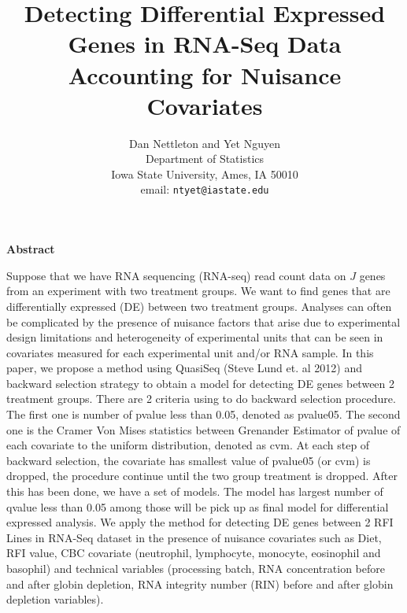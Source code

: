\documentclass[12pt, letter]{article}\usepackage[]{graphicx}\usepackage[]{color}
\begin{document}
\title{\bf Detecting Differential Expressed Genes in RNA-Seq Data
Accounting for Nuisance Covariates}
\author{Dan Nettleton  and Yet Nguyen\\
Department of Statistics \\ 
Iowa State University, Ames, IA 50010\\ 
email: \texttt{ntyet@iastate.edu} }

\maketitle



\begin{center}
\textbf{Abstract}
\end{center}

Suppose that we have RNA sequencing (RNA-seq) read count data
on $J$ genes from an experiment with two treatment groups.
We want to find genes that are differentially expressed (DE) between
two treatment groups.
Analyses can often be complicated by the presence of nuisance factors
that arise due to experimental design limitations and heterogeneity of
experimental units that can be seen in  covariates
measured for each experimental unit and/or RNA sample. In this paper, we propose a method using QuasiSeq (Steve Lund et. al 2012) and backward selection strategy to obtain a  model for detecting DE genes between 2 treatment groups. 
There are 2 criteria using to do backward selection procedure. The first one is number of pvalue less than 0.05, denoted as pvalue05. The second one is the Cramer Von Mises statistics between Grenander Estimator of pvalue of each covariate to the uniform distribution, denoted as cvm. At each step of backward selection, the covariate has smallest value of pvalue05 (or cvm) is dropped, the procedure continue until the two group treatment is dropped. After this has been done, we have a set of models. The model has largest number of qvalue less than 0.05 among those will be pick up as final model for differential expressed analysis. We apply the method for detecting DE genes between 2 RFI Lines in RNA-Seq dataset in the presence of nuisance covariates such as Diet, RFI value, CBC covariate (neutrophil, lymphocyte, monocyte, eosinophil and basophil) and technical variables (processing batch, RNA concentration before and after globin depletion, RNA integrity number (RIN) before and after globin depletion
variables).



\vspace*{.3in}
\end{document}
